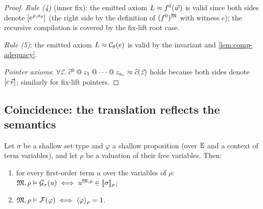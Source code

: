 \begin{proof}
\emph{Rule (4)} (inner fix): the emitted axiom $L \approx f^0(\vec{w})$ is
valid since both sides denote $[e^{\rho,\sigma_\theta}]$ (the right
side by the definition of $(f^0)^{\mathfrak{M}}$ with witness $e$); the recursive
compilation is covered by the fix-lift root case.

\emph{Rule (5)}: the emitted axiom $L \approx \mathcal{C}_\theta(e)$ is valid by
the invariant and \cref{lem:comp-adequacy}.

\emph{Pointer axioms}: $\forall \tup{z}.\ \Ihat{c}^0 \fapp z_1 \fapp
\cdots \fapp z_{a_c} \feq \Ihat{c}(\tup{z})$ holds because both sides
denote $[c\,\vec{e}]$; similarly for fix-lift pointers.
\end{proof}

\subsection{Coincidence: the translation reflects the semantics}
\label{sec:semantics-coincidence}

\begin{lemma}[Coincidence]
\label{lem:coincidence}
Let $\sigma$ be a shallow set type and $\varphi$ a shallow proposition
(over $\mathbb{E}$ and a context of term variables), and let $\rho$ be a
valuation of their free variables.  Then:
\begin{enumerate}[leftmargin=2em]
\item for every first-order term $u$ over the variables of $\rho$:\quad
  $\mathfrak{M}, \rho \vDash \mathcal{G}_{\sigma}(u) \iff u^{\mathfrak{M},\rho} \in
  [\![ \sigma ]\!]_{\rho}$;
\item $\mathfrak{M}, \rho \vDash \mathcal{F}(\varphi) \iff \langle \varphi \rangle_{\rho} = 1$.
\end{enumerate}
\end{lemma}

